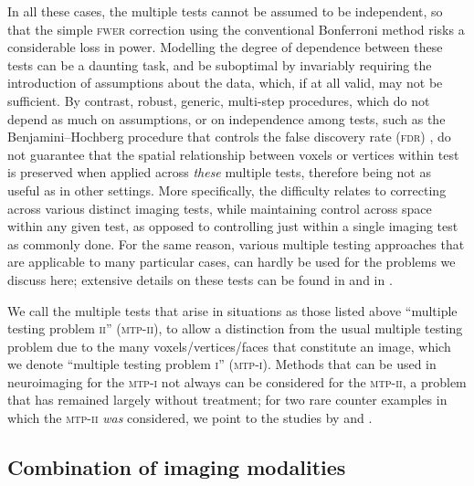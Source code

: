 In all these cases, the multiple tests cannot be assumed to be independent, so that the simple \textsc{fwer} correction using the conventional Bonferroni method risks a considerable loss in power. Modelling the degree of dependence between these tests can be a daunting task, and be suboptimal by invariably requiring the introduction of assumptions about the data, which, if at all valid, may not be sufficient. By contrast, robust, generic, multi-step procedures, which do not depend as much on assumptions, or on independence among tests, such as the Benjamini--Hochberg procedure that controls the false discovery rate (\textsc{fdr}) \citep{Benjamini1995, Genovese2002}, do not guarantee that the spatial relationship between voxels or vertices within test is preserved when applied across \emph{these} multiple tests, therefore being not as useful as in other settings. More specifically, the difficulty relates to correcting across various distinct imaging tests, while maintaining control across space within any given test, as opposed to controlling just within a single imaging test as commonly done. For the same reason, various multiple testing approaches that are applicable to many particular cases, can hardly be used for the problems we discuss here; extensive details on these tests can be found in \citet{Hochberg1987} and in \citet{Hsu1996}.

We call the multiple tests that arise in situations as those listed above ``multiple testing problem \textsc{ii}'' (\textsc{mtp-ii}), to allow a distinction from the usual multiple testing problem due to the many voxels/vertices/faces that constitute an image, which we denote ``multiple testing problem \textsc{i}'' (\textsc{mtp-i}). Methods that can be used in neuroimaging for the \textsc{mtp-i} not always can be considered for the \textsc{mtp-ii}, a problem that has remained largely without treatment; for two rare counter examples in which the \textsc{mtp-ii} \emph{was} considered, we point to the studies by \citet{Licata2013} and \citet{AbouElseoud2014}.

\subsection{Combination of imaging modalities}
\label{sec:comb:fusion}

